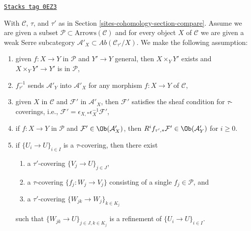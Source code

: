 \begin{definition}
\label{sites-cohomology-situation-compare}
\href{https://stacks.math.columbia.edu/tag/0EZ3}{\texttt{Stacks tag 0EZ3}}

With $\mathcal{C}$, $\tau$, and $\tau'$ as in Section \ref{sites-cohomology-section-compare}.
Assume we are given a subset $\mathcal{P} \subset \text{Arrows}(\mathcal{C})$
and for every object $X$ of $\mathcal{C}$ we are given a weak Serre subcategory
$\mathcal{A}'_X \subset \textit{Ab}(\mathcal{C}_{\tau'}/X)$.
We make the following assumption:
\begin{enumerate}
\item
\label{sites-cohomology-item-base-change-P}
given $f : X \to Y$ in $\mathcal{P}$ and $Y' \to Y$ general,
then $X \times_Y Y'$ exists and $X \times_Y Y' \to Y'$ is in $\mathcal{P}$,
\item
\label{sites-cohomology-item-restriction-A}
$f_{\tau'}^{-1}$ sends $\mathcal{A}'_Y$ into $\mathcal{A}'_X$
for any morphism $f : X \to Y$ of $\mathcal{C}$,
\item
\label{sites-cohomology-item-A-sheaf}
given $X$ in $\mathcal{C}$ and $\mathcal{F}'$ in $\mathcal{A}'_X$, then
$\mathcal{F}'$ satisfies the sheaf condition for $\tau$-coverings, i.e.,
$\mathcal{F}' = \epsilon_{X, *}\epsilon_X^{-1}\mathcal{F}'$,
\item
\label{sites-cohomology-item-A-and-P}
if $f : X \to Y$ in $\mathcal{P}$ and
$\mathcal{F}' \in \Ob(\mathcal{A}'_X)$, then
$R^if_{\tau', *}\mathcal{F}' \in \Ob(\mathcal{A}'_Y)$
for $i \geq 0$.
\item
\label{sites-cohomology-item-refine-tau-by-P}
if $\{U_i \to U\}_{i \in I}$ is a $\tau$-covering, then there exist
\begin{enumerate}
\item a $\tau'$-covering $\{V_j \to U\}_{j \in J}$,
\item a $\tau$-covering $\{f_j : W_j \to V_j\}$ consisting
of a single $f_j \in \mathcal{P}$, and
\item a $\tau'$-covering $\{W_{jk} \to W_j\}_{k \in K_j}$
\end{enumerate}
such that $\{W_{jk} \to U\}_{j \in J, k \in K_j}$ is a refinement of
$\{U_i \to U\}_{i \in I}$.
\end{enumerate}
\end{definition}


